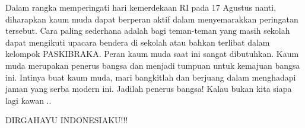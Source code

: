 	Dalam rangka memperingati hari kemerdekaan RI pada 17 Agustus nanti, diharapkan kaum muda dapat berperan aktif dalam menyemarakkan peringatan tersebut. Cara paling sederhana adalah bagi teman-teman yang masih sekolah dapat mengikuti upacara bendera di sekolah atau bahkan terlibat dalam kelompok PASKIBRAKA. Peran kaum muda saat ini sangat dibutuhkan. Kaum muda merupakan penerus bangsa dan menjadi tumpuan untuk kemajuan bangsa ini. Intinya buat kaum muda, mari bangkitlah dan berjuang dalam menghadapi jaman yang serba modern ini. Jadilah penerus bangsa! Kalau bukan kita siapa lagi kawan .. 
	
DIRGAHAYU INDONESIAKU!!! 